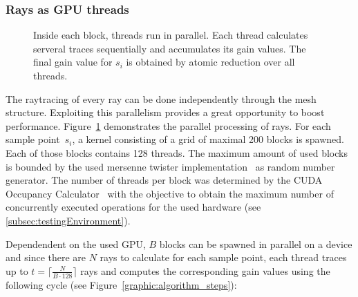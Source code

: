 \subsubsection{Rays as GPU threads}
\label{subsubsec:rays}
\begin{figure}[H]
  \centerline
  {}
  \caption{Inside each block, threads run in parallel.  Each
    thread calculates serveral traces sequentially and accumulates its
    gain values. The final gain value for $s_i$ is obtained by atomic
    reduction over all threads.}

  \label{graphic:kernel}
\end{figure}
    The raytracing of every ray can be done independently through the
    mesh structure.  Exploiting this parallelism provides a great
    opportunity to boost performance. Figure~\ref{graphic:kernel}
    demonstrates the parallel processing of rays. For each sample
    point~$s_i$, a kernel consisting of a grid of maximal 200
    blocks is spawned. Each of those blocks contains 128 threads.
    The maximum amount of used blocks is bounded by the used mersenne
    twister implementation~\cite{mersenne_twister} as random number
    generator.  The number of threads per block was determined by the
    CUDA Occupancy Calculator~\cite{occupancy_calculator} with the
    objective to obtain the maximum number of concurrently executed
    operations for the used hardware (see
    \cref{subsec:testingEnvironment}).
    
    Dependendent on the used GPU, $B$ blocks can be spawned in
    parallel on a device and since there are $N$ rays to calculate for
    each sample point, each thread traces up to $t = \lceil\frac
    {N}{B\cdot128}\rceil$ rays and computes the corresponding gain
    values using the following cycle (see
    Figure~\ref{graphic:algorithm_steps}):
    
